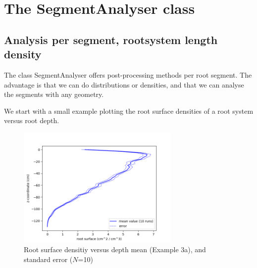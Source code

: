 \newpage
\section{The SegmentAnalyser class} \label{sec:sa}

\subsection{Analysis per segment, rootsystem length density}

The class SegmentAnalyser offers post-processing methods per root segment. The advantage is that we can do distributions or densities, and that we can analyse the segments with any geometry. 

We start with a small example plotting the root surface densities of a root system versus root depth.



\begin{figure}
\centering
\includegraphics[width=0.7\textwidth]{example_3c.png}
\caption{Root surface densitiy versus depth mean (Example 3a), and standard error ($N$=10)} \label{fig:surface_density}
\end{figure}


